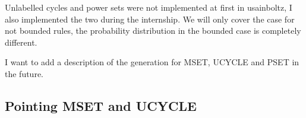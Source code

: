 \documentclass{article}
\begin{document}
Unlabelled cycles and power sets were not implemented at first in usainboltz, I also implemented the two during the internship. We will only cover the case for not bounded rules, the probability distribution in the bounded case is completely different.

I want to add a description of the generation for MSET, UCYCLE and PSET in the future.

\subsection{Pointing MSET and UCYCLE}



\end{document}
